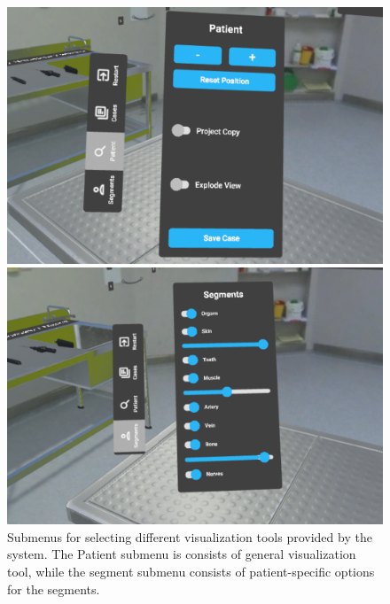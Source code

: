\begin{figure}[ht]
    \centering
    \begin{minipage}{.5\textwidth}
      \centering
      \includegraphics[width=0.99\linewidth]{images/implementation/user_interface/patient.png}
    \end{minipage}%
    \begin{minipage}{.5\textwidth}
      \centering
      \includegraphics[width=0.99\linewidth]{images/implementation/user_interface/segments.png}
    \end{minipage}
    \caption{\label{fig::UIPatientSegments}Submenus for selecting different visualization tools provided by the system. The Patient submenu is consists of general visualization tool, while the segment submenu consists of patient-specific options for the segments.}
  \end{figure}